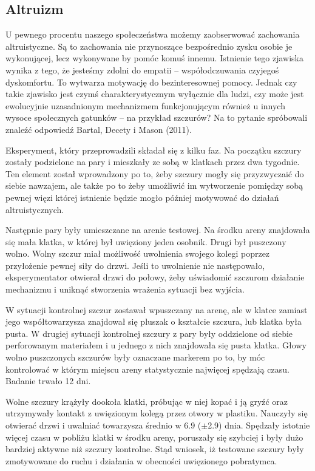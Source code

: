 \documentclass{psychol}
\begin{document}

\subsection{Altruizm}

U pewnego procentu naszego społeczeństwa możemy zaobserwować zachowania altruistyczne. Są to zachowania nie przynoszące bezpośrednio zysku osobie je wykonującej, lecz wykonywane by pomóc komuś innemu. Istnienie tego zjawiska wynika z tego, że jesteśmy zdolni do empatii -- współodczuwania czyjegoś dyskomfortu. To wytwarza motywację do bezinteresownej pomocy. Jednak czy takie zjawisko jest czymś charakterystycznym wyłącznie dla ludzi, czy może jest ewolucyjnie uzasadnionym mechanizmem funkcjonującym również u innych wysoce społecznych gatunków -- na przykład szczurów? Na to pytanie spróbowali znaleźć odpowiedź Bartal, Decety i Mason (2011).

Eksperyment, który przeprowadzili składał się z kilku faz. Na początku szczury zostały podzielone na pary i mieszkały ze sobą w klatkach przez dwa tygodnie. Ten element został wprowadzony po to, żeby szczury mogły się przyzwyczaić do siebie nawzajem, ale także po to żeby umożliwić im wytworzenie pomiędzy sobą pewnej więzi której istnienie będzie mogło później motywować do działań altruistycznych.

Następnie pary były umieszczane na arenie testowej. Na środku areny znajdowała się mała klatka, w której był uwięziony jeden osobnik. Drugi był puszczony wolno. Wolny szczur miał możliwość uwolnienia swojego kolegi poprzez przyłożenie pewnej siły do drzwi. Jeśli to uwolnienie nie następowało, eksperymentator otwierał drzwi do połowy, żeby uświadomić szczurom działanie mechanizmu i uniknąć stworzenia wrażenia sytuacji bez wyjścia.

W sytuacji kontrolnej szczur zostawał wpuszczany na arenę, ale w klatce zamiast jego współtowarzysza znajdował się pluszak o kształcie szczura, lub klatka była pusta. W drugiej sytuacji kontrolnej szczury z pary były oddzielone od siebie perforowanym materiałem i u jednego z nich znajdowała się pusta klatka. Głowy wolno puszczonych szczurów były oznaczane markerem po to, by móc kontrolować w którym miejscu areny statystycznie najwięcej spędzają czasu. Badanie trwało 12 dni.

Wolne szczury krążyły dookoła klatki, próbując w niej kopać i ją gryźć oraz utrzymywały kontakt z uwięzionym kolegą przez otwory w plastiku. Nauczyły się otwierać drzwi i uwalniać towarzysza średnio w 6.9 ($\pm$2.9) dnia. Spędzały istotnie więcej czasu w pobliżu klatki w środku areny, poruszały się szybciej i były dużo bardziej aktywne niż szczury kontrolne. Stąd wniosek, iż testowane szczury były zmotywowane do ruchu i działania w obecności uwięzionego pobratymca.
\end{document}

